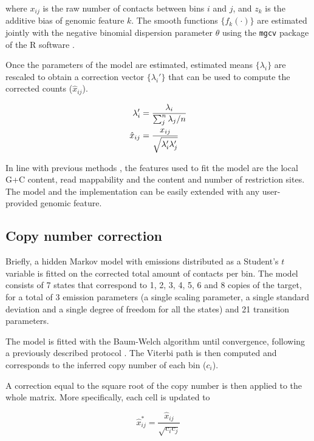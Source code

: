 \documentclass{bioinfo}
\begin{document}
\begin{methods}
\noindent
where $x_{ij}$ is the raw number of contacts between bins $i$ and $j$, and
$z_k$ is the additive bias of genomic feature $k$. The smooth functions
$\{f_k(\cdot)\}$ are estimated jointly with the negative binomial
dispersion parameter $\theta$ using the \texttt{mgcv} package
\citep{wood2011fast} of the R software \citep{coreteam2014r}.

Once the parameters of the model are estimated, estimated
means $\{\lambda_i\}$ are rescaled to obtain a correction vector $\{\lambda_i'\}$ that
can be used to compute the corrected counts ($\hat{x}_{ij}$).

\begin{align}
\notag
\lambda_i' &= \frac{\lambda_i}{\sum_j^n{\lambda_j}/n} \\
\label{eq:xhat}
\hat{x}_{ij} &= \frac{x_{ij}}{\sqrt{\lambda_i'\lambda_j'}}
\end{align}

In line with previous methods
\citep{yaffe2011probabilistic,hu2012hicnorm}, the features
used to fit the model are the local G+C content, read mappability and the 
content and number of restriction sites. The model and the implementation
can be easily extended with any user-provided genomic feature.

\subsection{Copy number correction}

Briefly, a hidden Markov model with emissions distributed as a Student's
$t$ variable is fitted on the corrected total amount of contacts per bin.
The model consists of 7 states that correspond to 1, 2, 3, 4, 5, 6 and 8
copies of the target, for a total of 3 emission parameters (a single
scaling parameter, a single standard deviation and a single degree of
freedom for all the states) and 21 transition parameters. 

The model is fitted with the Baum-Welch algorithm \citep{baum1966} until
convergence, following a previously described protocol \citep{filion2010systematic}.
The Viterbi path is then computed and corresponds to the inferred copy
number of each bin ($c_i$).

A correction equal to the square root of the copy number is then applied
to the whole matrix. More specifically, each cell is updated to


\begin{equation}
\label{eq:cnvnorm}
\hat{x}_{ij}^* = \frac{\hat{x}_{ij}}{\sqrt{c_ic_j}}
\end{equation}


\end{methods}
\end{document}
